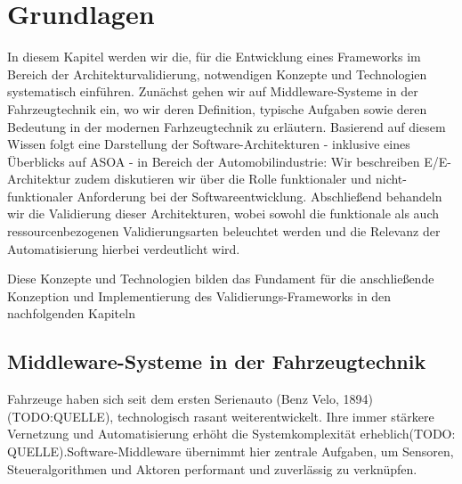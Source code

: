 \chapter{Grundlagen}
\label{sect:basics}

In diesem Kapitel werden wir die, für die Entwicklung eines Frameworks im Bereich der Architekturvalidierung, notwendigen Konzepte und Technologien systematisch einführen. Zunächst gehen wir auf Middleware-Systeme in der Fahrzeugtechnik ein, wo wir deren Definition, typische Aufgaben sowie deren Bedeutung in der modernen Farhzeugtechnik zu erläutern. Basierend auf diesem Wissen folgt eine Darstellung der Software-Architekturen - inklusive eines Überblicks auf ASOA - in Bereich der Automobilindustrie: Wir beschreiben E/E-Architektur zudem diskutieren wir über die Rolle funktionaler und nicht-funktionaler Anforderung bei der Softwareentwicklung. Abschließend behandeln wir die Validierung dieser Architekturen, wobei sowohl die funktionale als auch ressourcenbezogenen Validierungsarten beleuchtet werden und die Relevanz der Automatisierung hierbei verdeutlicht wird.  

Diese Konzepte und Technologien bilden das Fundament für die anschließende Konzeption und Implementierung des Validierungs-Frameworks in den nachfolgenden Kapiteln







\section{Middleware-Systeme in der Fahrzeugtechnik}
\label{sect:middleware}

Fahrzeuge haben sich seit dem ersten Serienauto (Benz Velo, 1894) (TODO:QUELLE), technologisch rasant weiterentwickelt. Ihre immer stärkere Vernetzung und Automatisierung erhöht die Systemkomplexität erheblich(TODO: QUELLE).Software-Middleware übernimmt hier zentrale Aufgaben, um Sensoren, Steueralgorithmen und Aktoren performant und zuverlässig zu verknüpfen.

